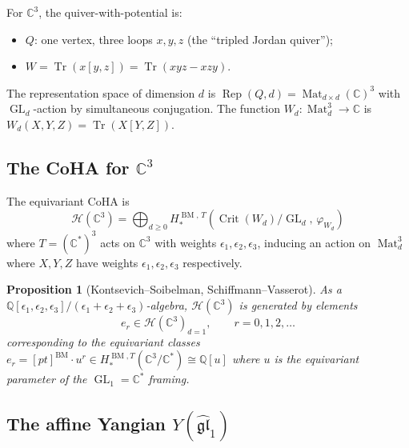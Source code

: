 \documentclass[11pt]{article}
\newtheorem{proposition}[theorem]{Proposition}
\theoremstyle{definition}
\theoremstyle{remark}
\newcommand{\CC}{\mathbb{C}}
\newcommand{\QQ}{\mathbb{Q}}
\newcommand{\Crit}{\operatorname{Crit}}
\newcommand{\Tr}{\operatorname{Tr}}
\newcommand{\CoHA}{\mathcal{H}}
\newcommand{\BM}{\operatorname{BM}}
\newcommand{\GL}{\operatorname{GL}}
\newcommand{\gl}{\mathfrak{gl}}
\begin{document}
For $\CC^3$, the quiver-with-potential is:
\begin{itemize}
 \item $Q$: one vertex, three loops $x, y, z$ (the ``tripled Jordan quiver'');
 \item $W = \Tr(x[y,z]) = \Tr(xyz - xzy)$.
\end{itemize}
The representation space of dimension $d$ is
$\operatorname{Rep}(Q, d) = \operatorname{Mat}_{d \times d}(\CC)^3$
with $\GL_d$-action by simultaneous conjugation. The function
$W_d \colon \operatorname{Mat}_d^3 \to \CC$ is
$W_d(X,Y,Z) = \Tr(X[Y,Z])$.


\subsection{The CoHA for $\CC^3$}
\label{subsec:c3-coha}

The equivariant CoHA is
\[
 \CoHA(\CC^3) = \bigoplus_{d \geq 0}
 H^{\BM,\, T}_*(\Crit(W_d) / \GL_d,\, \varphi_{W_d})
\]
where $T = (\CC^*)^3$ acts on $\CC^3$ with weights $\epsilon_1, \epsilon_2,
\epsilon_3$, inducing an action on $\operatorname{Mat}_d^3$ where $X, Y, Z$
have weights $\epsilon_1, \epsilon_2, \epsilon_3$ respectively.

\begin{proposition}[Kontsevich--Soibelman, Schiffmann--Vasserot]
\label{prop:c3-coha-generators}
As a $\QQ[\epsilon_1, \epsilon_2, \epsilon_3]/(\epsilon_1+\epsilon_2+\epsilon_3)$-algebra,
$\CoHA(\CC^3)$ is generated by elements
\[
 e_r \in \CoHA(\CC^3)_{d=1}, \qquad r = 0, 1, 2, \ldots
\]
corresponding to the equivariant classes
$e_r = [pt]^{\BM} \cdot u^r \in H^{\BM,T}_*(\CC^3/\CC^*) \cong \QQ[u]$
where $u$ is the equivariant parameter of the $\GL_1 = \CC^*$ framing.
\end{proposition}


\subsection{The affine Yangian $Y(\widehat{\gl}_1)$}
\label{subsec:affine-yangian-gl1}
\end{document}

